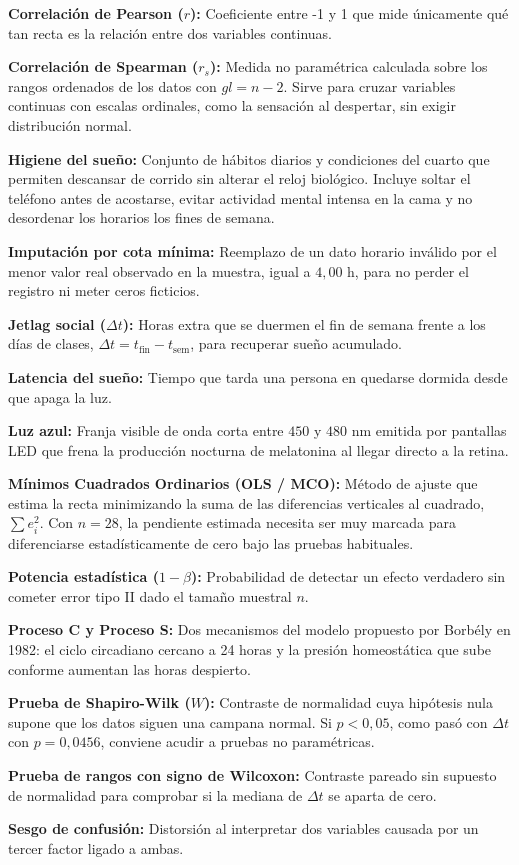 \documentclass[12pt, letterpaper]{article}
\begin{document}
{\setlength{\parskip}{0.75ex}
\textbf{Correlación de Pearson ($r$):} Coeficiente entre -1 y 1 que mide únicamente qué tan recta es la relación entre dos variables continuas.

\textbf{Correlación de Spearman ($r_s$):} Medida no paramétrica calculada sobre los rangos ordenados de los datos con $gl = n - 2$. Sirve para cruzar variables continuas con escalas ordinales, como la sensación al despertar, sin exigir distribución normal.

\textbf{Higiene del sueño:} Conjunto de hábitos diarios y condiciones del cuarto que permiten descansar de corrido sin alterar el reloj biológico. Incluye soltar el teléfono antes de acostarse, evitar actividad mental intensa en la cama y no desordenar los horarios los fines de semana.

\textbf{Imputación por cota mínima:} Reemplazo de un dato horario inválido por el menor valor real observado en la muestra, igual a $4{,}00\text{ h}$, para no perder el registro ni meter ceros ficticios.

\textbf{Jetlag social ($\Delta t$):} Horas extra que se duermen el fin de semana frente a los días de clases, $\Delta t = t_{\text{fin}} - t_{\text{sem}}$, para recuperar sueño acumulado.

\textbf{Latencia del sueño:} Tiempo que tarda una persona en quedarse dormida desde que apaga la luz.

\textbf{Luz azul:} Franja visible de onda corta entre $450$ y $480\text{ nm}$ emitida por pantallas LED que frena la producción nocturna de melatonina al llegar directo a la retina.

\textbf{Mínimos Cuadrados Ordinarios (OLS / MCO):} Método de ajuste que estima la recta minimizando la suma de las diferencias verticales al cuadrado, $\sum e_i^2$. Con $n = 28$, la pendiente estimada necesita ser muy marcada para diferenciarse estadísticamente de cero bajo las pruebas habituales.

\textbf{Potencia estadística ($1 - \beta$):} Probabilidad de detectar un efecto verdadero sin cometer error tipo II dado el tamaño muestral $n$.

\textbf{Proceso C y Proceso S:} Dos mecanismos del modelo propuesto por Borbély en 1982: el ciclo circadiano cercano a 24 horas y la presión homeostática que sube conforme aumentan las horas despierto.

\textbf{Prueba de Shapiro-Wilk ($W$):} Contraste de normalidad cuya hipótesis nula supone que los datos siguen una campana normal. Si $p < 0{,}05$, como pasó con $\Delta t$ con $p = 0{,}0456$, conviene acudir a pruebas no paramétricas.

\textbf{Prueba de rangos con signo de Wilcoxon:} Contraste pareado sin supuesto de normalidad para comprobar si la mediana de $\Delta t$ se aparta de cero.

\textbf{Sesgo de confusión:} Distorsión al interpretar dos variables causada por un tercer factor ligado a ambas.\par
}
\end{document}
